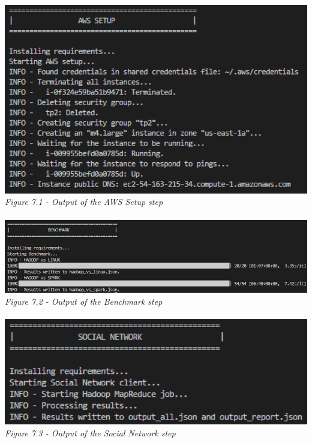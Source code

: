 \begin{center}
    \includegraphics[width=14cm]{Resources/setup.png}\\
    \emph{Figure 7.1 - Output of the AWS Setup step}\\
    \hfill\\
    \includegraphics[width=14cm]{Resources/benchmark.png}\\
    \emph{Figure 7.2 - Output of the Benchmark step}\\
    \hfill\\
    \includegraphics[width=14cm]{Resources/social.png}\\
    \emph{Figure 7.3 - Output of the Social Network step}\\
\end{center}
